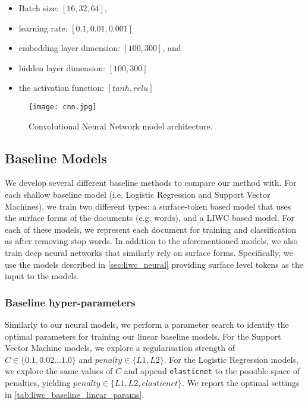 \begin{itemize}
  \item Batch size: $[16, 32, 64]$,
  \item learning rate: $[0.1, 0.01, 0.001]$
  \item embedding layer dimension: $[100, 300]$, and
  \item hidden layer dimension: $[100, 300]$.
  \item the activation function: $[tanh, relu]$
\end{itemize}

\begin{figure}
  \centering
  \texttt{[image: cnn.jpg]}
  \caption{Convolutional Neural Network model architecture.}
  \label{fig:liwc_cnn}
\end{figure}

\subsection{Baseline Models}

We develop several different baseline methods to compare our method with. For each shallow baseline model (i.e. Logistic Regression and Support Vector Machines), we train two different types: a surface-token based model that uses the surface forms of the documents (e.g. words), and a LIWC based model. For each of these models, we represent each document for training and classification as  after removing stop words. In addition to the aforementioned models, we also train deep neural networks that similarly rely on surface forms. Specifically, we use the models described in \autoref{sec:liwc_neural} providing surface level tokens as the input to the models.

\subsubsection{Baseline hyper-parameters}

Similarly to our neural models, we perform a parameter search to identify the optimal parameters for training our linear baseline models. For the Support Vector Machine models, we explore a regularisation strength of $C \in \{0.1, 0.02 \ldots 1.0\}$ and $penalty \in \{L1, L2\}$. For the Logistic Regression models, we explore the same values of $C$ and append \texttt{elasticnet} to the possible space of penalties, yielding $penalty \in \{L1, L2, elasticnet\}$. We report the optimal settings in \autoref{tab:liwc_baseline_linear_params}.

